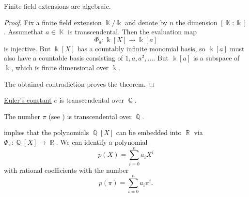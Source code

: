 \begin{proposition}\label{thm:finite_field_extensions_are_algebraic}
  Finite field extensions are algebraic.
\end{proposition}
\begin{proof}
  Fix a finite field extension \( \BbbK / \Bbbk \) and denote by \( n \) the dimension \( [\BbbK : \Bbbk] \). Assume\LEM that \( a \in \BbbK \) is transcendental. Then the evaluation map
  \begin{equation*}
    \Phi_a: \Bbbk[X] \to \Bbbk[a]
  \end{equation*}
  is injective. But \( \Bbbk[X] \) has a countably infinite monomial basis, so \( \Bbbk[a] \) must also have a countable basis consisting of \( 1, a, a^2, \ldots \). But \( \Bbbk[a] \) is a subspace of \( \Bbbk \), which is finite dimensional over \( \Bbbk \).

  The obtained contradiction proves the theorem.
\end{proof}

\begin{theorem}\label{thm:e_is_transcendental}\label{thm:eulers_constant_is_transcendental}
  \hyperref[def:exponential_function]{Euler's constant} \( e \) is transcendental over \( \BbbQ \).
\end{theorem}

\begin{theorem}\label{thm:pi_is_transcendental}\mcite\cite[454]{Knapp2016BAlg}
  The number \( \pi \) (see ) is transcendental over \( \BbbQ \).
\end{theorem}

\begin{example}\label{ex:polynomials_over_pi}
   implies that the polynomials \( \BbbQ[X] \) can be embedded into \( \BbbR \) via \( \Phi_\pi: \BbbQ[X] \to \BbbR \). We can identify a polynomial
  \begin{equation*}
    p(X) = \sum_{i=0}^n a_i X^i
  \end{equation*}
  with rational coefficients with the number
  \begin{equation*}
    p(\pi) = \sum_{i=0}^n a_i \pi^i.
  \end{equation*}
\end{example}

